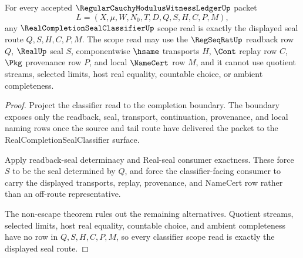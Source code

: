\begin{theorem}
\label{thm:regular-cauchy-modulus-witness-ledger-seal-classifier-scope}
For every accepted $\RegularCauchyModulusWitnessLedgerUp$ packet
$$
L=(X,\mu,W,N_0,T,D,Q,S,H,C,P,M),
$$
any $\RealCompletionSealClassifierUp$ scope read is exactly the displayed seal route $Q,S,H,C,P,M$. The scope read may use the $\RegSeqRatUp$ readback row $Q$, $\RealUp$ seal $S$, componentwise $\hsame$ transports $H$, $\Cont$ replay row $C$, $\Pkg$ provenance row $P$, and local $\NameCert$ row $M$, and it cannot use quotient streams, selected limits, host real equality, countable choice, or ambient completeness.
\end{theorem}
\begin{proof}
Project the classifier read to the completion boundary. The boundary exposes only the readback, seal, transport, continuation, provenance, and local naming rows once the source and tail route have delivered the packet to the RealCompletionSealClassifier surface.

Apply readback-seal determinacy and Real-seal consumer exactness. These force $S$ to be the seal determined by $Q$, and force the classifier-facing consumer to carry the displayed transports, replay, provenance, and NameCert row rather than an off-route representative.

The non-escape theorem rules out the remaining alternatives. Quotient streams, selected limits, host real equality, countable choice, and ambient completeness have no row in $Q,S,H,C,P,M$, so every classifier scope read is exactly the displayed seal route.
\end{proof}



